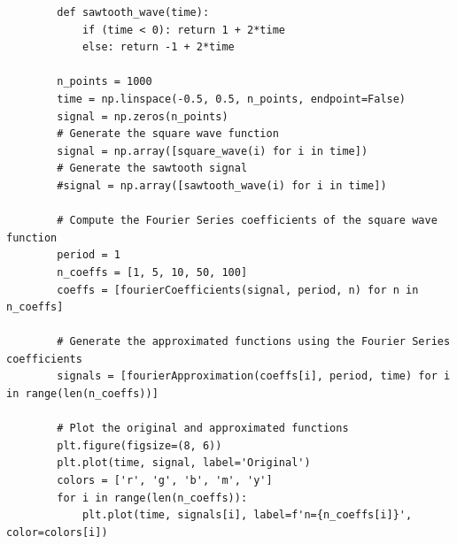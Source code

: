 \documentclass[10pt,a4paper, margin=1in]{article}
\begin{document}
\begin{enumerate}
\begin{enumerate}
\begin{verbatim}
        def sawtooth_wave(time):
            if (time < 0): return 1 + 2*time    
            else: return -1 + 2*time
            
        n_points = 1000
        time = np.linspace(-0.5, 0.5, n_points, endpoint=False)
        signal = np.zeros(n_points)
        # Generate the square wave function
        signal = np.array([square_wave(i) for i in time])
        # Generate the sawtooth signal
        #signal = np.array([sawtooth_wave(i) for i in time])
        
        # Compute the Fourier Series coefficients of the square wave function
        period = 1
        n_coeffs = [1, 5, 10, 50, 100]
        coeffs = [fourierCoefficients(signal, period, n) for n in n_coeffs]
        
        # Generate the approximated functions using the Fourier Series coefficients
        signals = [fourierApproximation(coeffs[i], period, time) for i in range(len(n_coeffs))]
        
        # Plot the original and approximated functions
        plt.figure(figsize=(8, 6))
        plt.plot(time, signal, label='Original')
        colors = ['r', 'g', 'b', 'm', 'y']
        for i in range(len(n_coeffs)):
            plt.plot(time, signals[i], label=f'n={n_coeffs[i]}', color=colors[i])
        

\end{verbatim}
\end{enumerate}
\end{enumerate}
\end{document}
